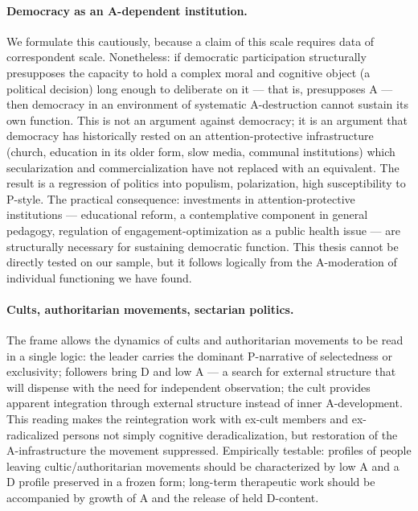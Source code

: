 \paragraph{Democracy as an A-dependent institution.} We formulate this cautiously, because a claim of this scale requires data of correspondent scale. Nonetheless: if democratic participation structurally presupposes the capacity to hold a complex moral and cognitive object (a political decision) long enough to deliberate on it --- that is, presupposes A --- then democracy in an environment of systematic A-destruction cannot sustain its own function. This is not an argument against democracy; it is an argument that democracy has historically rested on an attention-protective infrastructure (church, education in its older form, slow media, communal institutions) which secularization and commercialization have not replaced with an equivalent. The result is a regression of politics into populism, polarization, high susceptibility to P-style. The practical consequence: investments in attention-protective institutions --- educational reform, a contemplative component in general pedagogy, regulation of engagement-optimization as a public health issue --- are structurally necessary for sustaining democratic function. This thesis cannot be directly tested on our sample, but it follows logically from the A-moderation of individual functioning we have found.

\paragraph{Cults, authoritarian movements, sectarian politics.} The frame allows the dynamics of cults and authoritarian movements to be read in a single logic: the leader carries the dominant P-narrative of selectedness or exclusivity; followers bring D and low A --- a search for external structure that will dispense with the need for independent observation; the cult provides apparent integration through external structure instead of inner A-development. This reading makes the reintegration work with ex-cult members and ex-radicalized persons not simply cognitive deradicalization, but restoration of the A-infrastructure the movement suppressed. Empirically testable: \DEIC{} profiles of people leaving cultic/authoritarian movements should be characterized by low A and a D profile preserved in a frozen form; long-term therapeutic work should be accompanied by growth of A and the release of held D-content.

